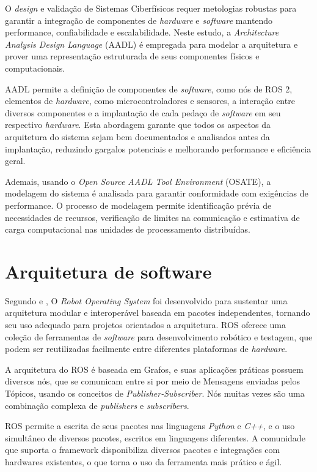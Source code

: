 O \textit{design} e validação de Sistemas Ciberfísicos requer metologias robustas para garantir a integração de componentes de \textit{hardware} e \textit{software} mantendo performance, confiabilidade e escalabilidade. Neste estudo, a \textit{Architecture Analysis Design Language} (AADL) é empregada para modelar a arquitetura e prover uma representação estruturada de seus componentes físicos e computacionais.

AADL permite a definição de componentes de \textit{software}, como nós de ROS 2, elementos de \textit{hardware}, como microcontroladores e sensores, a interação entre diversos componentes e a implantação de cada pedaço de \textit{software} em seu respectivo \textit{hardware}. Esta abordagem garante que todos os aspectos da arquitetura do sistema sejam bem documentados e analisados antes da implantação, reduzindo gargalos potenciais e melhorando performance e eficiência geral.

Ademais, usando o \textit{Open Source AADL Tool Environment} (OSATE), a modelagem do sistema é analisada para garantir conformidade com exigências de performance. O processo de modelagem permite identificação prévia de necessidades de recursos, verificação de limites na comunicação e estimativa de carga computacional nas unidades de processamento distribuídas.

\section{Arquitetura de software}
Segundo \cite{Bernardo2025} e \cite{ROSWebsite}, O \textit{Robot Operating System} foi desenvolvido para sustentar uma arquitetura modular e interoperável baseada em pacotes independentes, tornando seu uso adequado para projetos orientados a arquitetura. ROS oferece uma coleção de ferramentas de \textit{software} para desenvolvimento robótico e testagem, que podem ser reutilizadas facilmente entre diferentes plataformas de \textit{hardware}.

A arquitetura do ROS é baseada em Grafos, e suas aplicações práticas possuem diversos nós, que se comunicam entre si por meio de Mensagens enviadas pelos Tópicos, usando os conceitos de \textit{Publisher-Subscriber}. Nós muitas vezes são uma combinação complexa de \textit{publishers} e \textit{subscribers}.

ROS permite a escrita de seus pacotes nas linguagens \textit{Python} e \textit{C++}, e o uso simultâneo de diversos pacotes, escritos em linguagens diferentes. A comunidade que suporta o framework disponibiliza diversos pacotes e integrações com hardwares existentes, o que torna o uso da ferramenta mais prático e ágil.